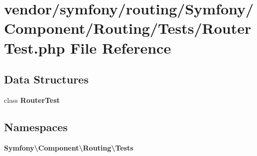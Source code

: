 \section{vendor/symfony/routing/\+Symfony/\+Component/\+Routing/\+Tests/\+Router\+Test.php File Reference}
\label{_router_test_8php}
\subsection*{Data Structures}
\begin{DoxyCompactItemize}
\item 
class {\bf Router\+Test}
\end{DoxyCompactItemize}
\subsection*{Namespaces}
\begin{DoxyCompactItemize}
\item 
 {\bf Symfony\textbackslash{}\+Component\textbackslash{}\+Routing\textbackslash{}\+Tests}
\end{DoxyCompactItemize}
